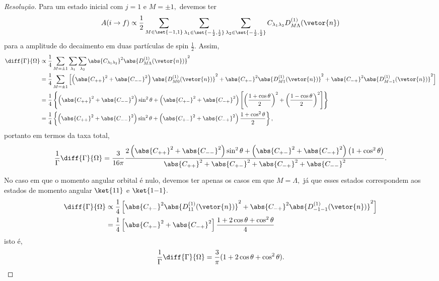 \begin{proof}[Resolução]
   Para um estado inicial com \(j = 1\) e \(M = \pm 1,\) devemos ter
   \begin{equation*}
      A(i \to f) \propto \frac12 \sum_{M \in \set{-1,1}} \sum_{\lambda_1 \in \set{-\frac12,\frac12}} \sum_{\lambda_2 \in \set{-\frac12,\frac12}} C_{\lambda_1 \lambda_2} D_{M \Lambda}^{(1)}(\vetor{n})
   \end{equation*}
   para a amplitude do decaimento em duas partículas de spin \(\frac12\). Assim,
   \begin{align*}
      \diff{\Gamma}{\Omega} &\propto \frac14 \sum_{M = \pm1} \sum_{\lambda_1} \sum_{\lambda_2} \abs{C_{\lambda_1 \lambda_2}}^2 \abs{D^{(1)}_{M \Lambda}(\vetor{n})}^2\\
                            &= \frac14 \sum_{M = \pm1}\left[\left(\abs{C_{++}}^2 + \abs{C_{--}}^2\right)\abs{D^{(1)}_{M0}(\vetor{n})}^2 + \abs{C_{+-}}^2\abs{D^{(1)}_{M1}(\vetor{n})}^2 + \abs{C_{-+}}^2 \abs{D^{(1)}_{M{-1}}(\vetor{n})}^2\right]\\
                            &= \frac14 \left\{\left(\abs{C_{++}}^2 + \abs{C_{--}}^2\right)\sin^2\theta +\left(\abs{C_{+-}}^2 + \abs{C_{-+}}^2\right)\left[\left(\frac{1 + \cos\theta}{2}\right)^2 + \left(\frac{1 - \cos\theta}{2}\right)^2\right]\right\}\\
                            &= \frac14 \left\{\left(\abs{C_{++}}^2 + \abs{C_{--}}^2\right)\sin^2\theta + \left(\abs{C_{+-}}^2 + \abs{C_{-+}}^2\right)\frac{1 + \cos^2\theta}{2}\right\},
   \end{align*}
   portanto em termos da taxa total,
   \begin{equation*}
      \frac{1}{\Gamma}\diff{\Gamma}{\Omega} = \frac{3}{16\pi}\frac{2\left(\abs{C_{++}}^2 + \abs{C_{--}}^2\right)\sin^2\theta + \left(\abs{C_{+-}}^2 + \abs{C_{-+}}^2\right)\left(1 + \cos^2\theta\right)}{\abs{C_{++}}^2 + \abs{C_{+-}}^2 + \abs{C_{-+}}^2 + \abs{C_{--}}^2}.
   \end{equation*}

   No caso em que o momento angular orbital é nulo, devemos ter apenas os casos em que \(M = \Lambda,\) já que esses estados correspondem aos estados de momento angular \(\ket{11}\) e \(\ket{1{-1}}.\)
   \begin{align*}
      \diff{\Gamma}{\Omega} &\propto \frac14 \left[\abs{C_{+-}}^2 \abs{D^{(1)}_{11}(\vetor{n})}^2 + \abs{C_{-+}}^2 \abs{D^{(1)}_{-1{-1}}(\vetor{n})}^2\right]\\
                            &= \frac14 \left[\abs{C_{+-}}^2 + \abs{C_{-+}}^2\right] \frac{1 + 2\cos\theta + \cos^2\theta}{4}
   \end{align*}
   isto é,
   \begin{equation*}
      \frac1\Gamma\diff{\Gamma}{\Omega} = \frac{3}{\pi} (1 + 2\cos\theta + \cos^2\theta).
   \end{equation*}


\end{proof}
